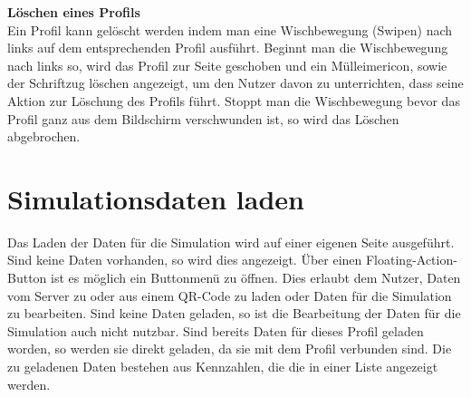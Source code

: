 	\textbf{Löschen eines Profils}\\
	Ein Profil kann gelöscht werden indem man eine Wischbewegung (Swipen) nach links auf dem entsprechenden Profil ausführt. Beginnt man die Wischbewegung nach links so, wird das Profil zur Seite geschoben und ein Mülleimericon, sowie der Schriftzug löschen angezeigt, um den Nutzer davon zu unterrichten, dass seine Aktion zur Löschung des Profils führt. Stoppt man die Wischbewegung bevor das Profil ganz aus dem Bildschirm verschwunden ist, so wird das Löschen abgebrochen.
	

	
	\section{Simulationsdaten laden}
	\label{sec:load-sim-data}
	
	Das Laden der Daten für die Simulation wird auf einer eigenen Seite ausgeführt. Sind keine Daten vorhanden, so wird dies angezeigt. Über einen Floating-Action-Button  ist es möglich ein Buttonmenü zu öffnen. Dies erlaubt dem Nutzer, Daten vom Server zu oder aus einem QR-Code zu laden oder Daten für die Simulation zu bearbeiten. Sind keine Daten geladen, so ist die Bearbeitung der Daten für die Simulation auch nicht nutzbar. Sind bereits Daten für dieses Profil geladen worden, so werden sie direkt geladen, da sie mit dem Profil verbunden sind. Die zu geladenen Daten bestehen aus Kennzahlen, die die in einer Liste angezeigt werden.
	
	

